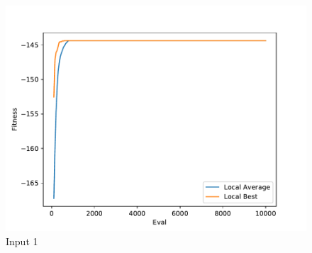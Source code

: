 \documentclass{standalone}
\begin{document}
\begin{figure}[!htb]
	\caption{Input 1}
	\label{fig:graph_1047}
	\includegraphics[width=\textwidth]{../graphs/graphs/1047.pdf}
\end{figure}
\end{document}
